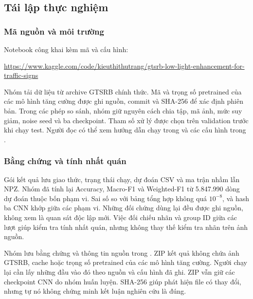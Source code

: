 \subsection{Tái lập thực nghiệm}
\subsubsection{Mã nguồn và môi trường}
Notebook công khai kèm mã và cấu hình:
\begin{center}
{\small\url{https://www.kaggle.com/code/kieuthithutrang/gtsrb-low-light-enhancement-for-traffic-signs}}
\end{center}
Nhóm tải dữ liệu từ archive GTSRB chính thức. Mã và trọng số pretrained của các mô hình tăng cường được ghi nguồn, commit và SHA-256 để xác định phiên bản. Trong các phép so sánh, nhóm giữ nguyên cách chia tập, mã ảnh, mức suy giảm, noise seed và ba checkpoint. Tham số xử lý được chọn trên validation trước khi chạy test. Người đọc có thể xem hướng dẫn chạy trong  và các cấu hình trong .

\subsubsection{Bằng chứng và tính nhất quán}
Gói kết quả lưu giao thức, trạng thái chạy, dự đoán CSV và ma trận nhầm lẫn NPZ. Nhóm đã tính lại Accuracy, Macro-F1 và Weighted-F1 từ 5.847.990 dòng dự đoán thuộc bốn phạm vi. Sai số so với bảng tổng hợp không quá $10^{-8}$, và hash ba CNN khớp giữa các phạm vi. Những đối chứng dùng lại đều được ghi nguồn, không xem là quan sát độc lập mới. Việc đối chiếu nhãn và group ID giữa các lượt giúp kiểm tra tính nhất quán, nhưng không thay thế kiểm tra nhãn trên ảnh nguồn.

Nhóm lưu bằng chứng và thông tin nguồn trong . ZIP kết quả không chứa ảnh GTSRB, cache hoặc trọng số pretrained của các mô hình tăng cường. Người chạy lại cần lấy những đầu vào đó theo nguồn và cấu hình đã ghi. ZIP vẫn giữ các checkpoint CNN do nhóm huấn luyện. SHA-256 giúp phát hiện file có thay đổi, nhưng tự nó không chứng minh kết luận nghiên cứu là đúng.
